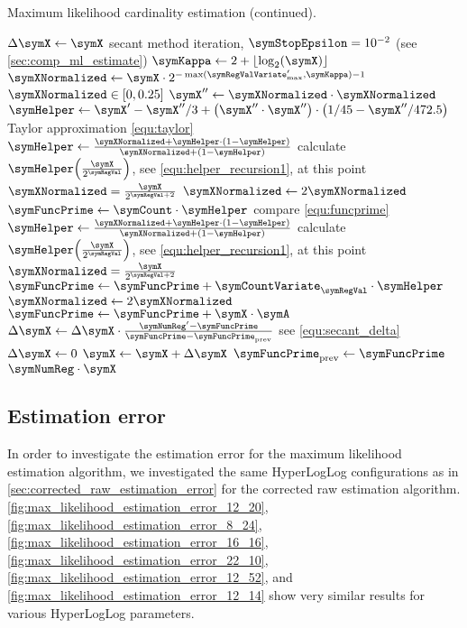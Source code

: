 \documentclass[a4paper]{scrartcl}
\begin{document}
\begin{algorithm}
\caption{Maximum likelihood cardinality estimation (continued).}
\begin{algorithmic}
\State $\Delta\symX \gets \symX$
\While{$\Delta\symX > \symX\cdot\symError$} \Comment secant method iteration, $\symStopEpsilon = 10^{-2}$ (see \cref{sec:comp_ml_estimate})
\State $\symKappa \gets 2+\lfloor\log_2(\symX)\rfloor$
\State $\symXNormalized \gets
\symX \cdot2^{-\max(\symRegValVariate'_\text{max}, \symKappa)-1}$
\Comment $\symXNormalized \in [0, 0.25]$
\State $\symX''\gets \symXNormalized\cdot\symXNormalized$
\State $\symHelper \gets
\symX' - \symX''/3 + \left(\symX''\cdot \symX''\right)\cdot\left(1/45-\symX''/472.5\right)$
\Comment Taylor approximation \eqref{equ:taylor}
\State $\symHelper \gets \frac{\symXNormalized+\symHelper\cdot(1-\symHelper)}{\symXNormalized+(1-\symHelper)}$
\Comment calculate $\symHelper\!\left(\frac{\symX}{2^{\symRegVal}}\right)$, see \eqref{equ:helper_recursion1}, at this point $\symXNormalized = \frac{\symX}{2^{\symRegVal+2}}$
\State $\symXNormalized \gets 2\symXNormalized$
\EndFor
\State $\symFuncPrime \gets \symCount\cdot\symHelper$
\Comment compare \eqref{equ:funcprime}
\State $\symHelper \gets \frac{\symXNormalized+\symHelper\cdot(1-\symHelper)}{\symXNormalized+(1-\symHelper)}$
\Comment calculate $\symHelper\!\left(\frac{\symX}{2^{\symRegVal}}\right)$, see \eqref{equ:helper_recursion1}, at this point $\symXNormalized = \frac{\symX}{2^{\symRegVal+2}}$
\State $\symFuncPrime\gets \symFuncPrime + \symCountVariate_\symRegVal\cdot\symHelper$
\State $\symXNormalized \gets 2\symXNormalized$
\EndFor
\State $\symFuncPrime\gets \symFuncPrime + \symX\cdot\symA$
\State $\Delta\symX \gets \Delta\symX \cdot \frac{\symNumReg' - \symFuncPrime}{\symFuncPrime - \symFuncPrime_\text{prev}}$
\Comment see \eqref{equ:secant_delta}
\Else
\State $\Delta\symX \gets 0$
\EndIf
\State $\symX \gets \symX + \Delta\symX$
\State $\symFuncPrime_\text{prev}\gets \symFuncPrime$
\EndWhile
\State \Return $\symNumReg\cdot\symX$
\EndFunction
\end{algorithmic}
\end{algorithm}

\subsection{Estimation error}
\label{sec:maximum_likelihood_estimation_error}
In order to investigate the estimation error for the maximum likelihood estimation algorithm, we investigated the same HyperLogLog configurations as in \cref{sec:corrected_raw_estimation_error} for the corrected raw estimation algorithm. \cref{fig:max_likelihood_estimation_error_12_20}, \cref{fig:max_likelihood_estimation_error_8_24},  \cref{fig:max_likelihood_estimation_error_16_16}, \cref{fig:max_likelihood_estimation_error_22_10}, \cref{fig:max_likelihood_estimation_error_12_52}, and \cref{fig:max_likelihood_estimation_error_12_14} show very similar results for various HyperLogLog parameters. 
\end{document}
